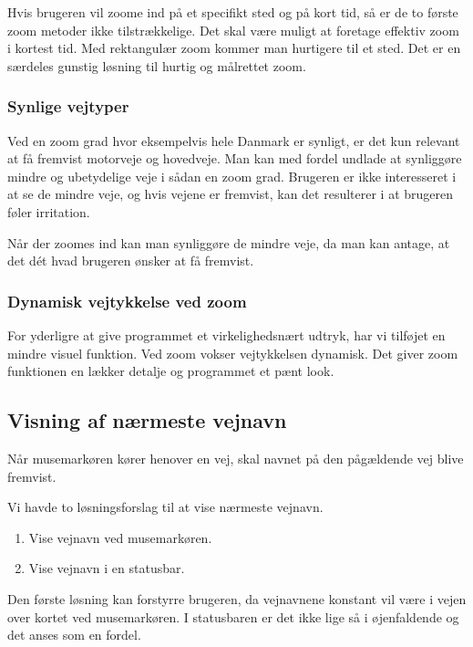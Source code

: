 Hvis brugeren vil zoome ind på et specifikt sted og på kort tid, så er de to første zoom metoder ikke tilstrækkelige. Det skal være muligt at foretage effektiv zoom i kortest tid. Med rektangulær zoom kommer man hurtigere til et sted. Det er en særdeles gunstig løsning til hurtig og målrettet zoom. 

\subsubsection{Synlige vejtyper}

Ved en zoom grad hvor eksempelvis hele Danmark er synligt, er det kun relevant at få fremvist motorveje og hovedveje. Man kan med fordel undlade at synliggøre mindre og ubetydelige veje i sådan en zoom grad. Brugeren er ikke interesseret i at se de mindre veje, og hvis vejene er fremvist, kan det resulterer i at brugeren føler irritation. 

Når der zoomes ind kan man synliggøre de mindre veje, da man kan antage, at det dét hvad brugeren ønsker at få fremvist.   

\subsubsection{Dynamisk vejtykkelse ved zoom}

For yderligre at give programmet et virkelighedsnært udtryk, har vi tilføjet en mindre visuel funktion. Ved zoom vokser vejtykkelsen dynamisk. Det giver zoom funktionen en lækker detalje og programmet et pænt look. 
  

\subsection{Visning af nærmeste vejnavn}

Når musemarkøren kører henover en vej, skal navnet på den pågældende vej blive fremvist.

Vi havde to løsningsforslag til at vise nærmeste vejnavn. 

\begin{enumerate}
   \item Vise vejnavn ved musemarkøren.
   \item Vise vejnavn i en statusbar.
\end{enumerate}

Den første løsning kan forstyrre brugeren, da vejnavnene konstant vil være i vejen over kortet ved musemarkøren. I statusbaren er det ikke lige så i øjenfaldende og det anses som en fordel. 

